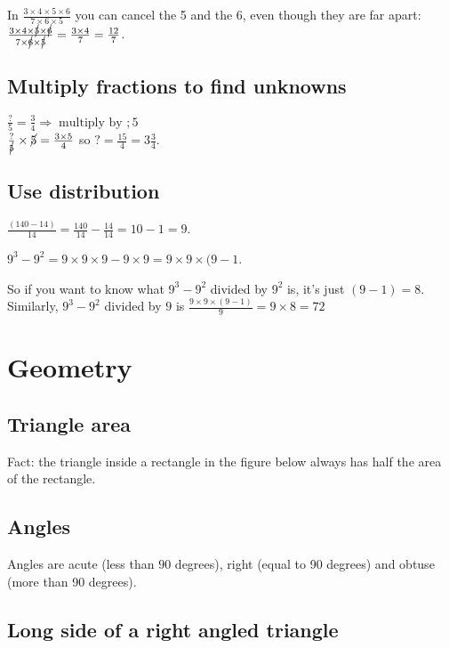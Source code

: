 \documentclass[fullpage,twocolumn]{article}
\begin{document}
In $\frac{3 \times 4 \times 5 \times 6}{7 \times 6 \times 5}$ you can cancel
the 5 and the 6, even though they are far apart: $\frac{3 \times 4 \times \cancel{5}
\times \cancel{6}}{ 7 \times  \cancel{6} \times \cancel{5}} = \frac{3 \times 4}{7} = \frac{12}{7}$.

\subsection{Multiply fractions to find unknowns}

$\frac{?}{5} = \frac{3}{4} \Rightarrow \; \mbox{multiply by } ; 5$\\
$\frac{?}{\cancel{5}} \times \cancel{5} = \frac{3 \times 5}{4}$ so  $? = \frac{15}{4} = 3\frac{3}{4}$.

\subsection{Use distribution}

$\frac{(140 - 14)}{14} = \frac{140}{14} - \frac{14}{14} = 10 - 1 = 9$.

$9^3 - 9^2 = 9 \times 9 \times 9 - 9 \times 9 = 9 \times 9 \times (9 - 1$.

So if you want to know what $9^3 - 9^2$ divided by $9^2$ is, it's 
just $(9-1) = 8$. Similarly, $9^3 - 9^2$ divided by $9$ is $\frac{9 \times 9 \times (9 - 1)}{9} = 9 \times 8 = 72$


\section{Geometry}

\subsection{Triangle area}
Fact: the triangle inside a rectangle in the figure below always has half the area
of the rectangle.


\vspace{3in}

\subsection{Angles}


Angles are acute (less than $90$ degrees), right (equal to 90 degrees) and obtuse (more than 90 degrees).

\subsection{Long side of a right angled triangle}
\end{document}

